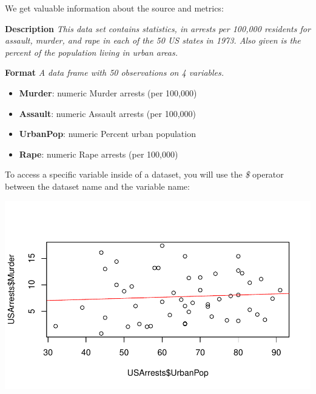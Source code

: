 \documentclass[]{book}
\newenvironment{Shaded}{\begin{snugshade}}{\end{snugshade}}
\newcommand{\CommentTok}[1]{\textcolor[rgb]{0.56,0.35,0.01}{\textit{#1}}}
\newcommand{\DataTypeTok}[1]{\textcolor[rgb]{0.13,0.29,0.53}{#1}}
\newcommand{\KeywordTok}[1]{\textcolor[rgb]{0.13,0.29,0.53}{\textbf{#1}}}
\newcommand{\NormalTok}[1]{#1}
\newcommand{\OperatorTok}[1]{\textcolor[rgb]{0.81,0.36,0.00}{\textbf{#1}}}
\newcommand{\StringTok}[1]{\textcolor[rgb]{0.31,0.60,0.02}{#1}}
\providecommand{\tightlist}{%
  \setlength{\itemsep}{0pt}\setlength{\parskip}{0pt}}
\theoremstyle{definition}
\theoremstyle{definition}
\theoremstyle{definition}
\theoremstyle{remark}
\begin{document}
We get valuable information about the source and metrics:

\textbf{Description} \emph{This data set contains statistics, in arrests
per 100,000 residents for assault, murder, and rape in each of the 50 US
states in 1973. Also given is the percent of the population living in
urban areas.}

\textbf{Format} \emph{A data frame with 50 observations on 4 variables.}

\begin{itemize}
\tightlist
\item
  \textbf{Murder}: numeric Murder arrests (per 100,000)
\item
  \textbf{Assault}: numeric Assault arrests (per 100,000)
\item
  \textbf{UrbanPop}: numeric Percent urban population
\item
  \textbf{Rape}: numeric Rape arrests (per 100,000)
\end{itemize}

To access a specific variable inside of a dataset, you will use the
\emph{\$} operator between the dataset name and the variable name:

\begin{Shaded}
\end{Shaded}

\begin{center}\includegraphics[width=0.7\linewidth]{DS4PS-I_files/figure-latex/unnamed-chunk-19-1} \end{center}
\end{document}
